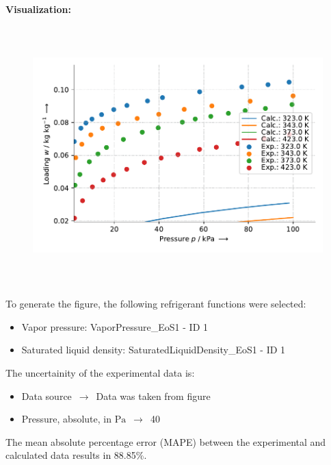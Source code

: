 \textbf{Visualization:}
%
\begin{figure}[!htp]
{\noindent\includegraphics[height=10cm, keepaspectratio]{figs/ads/ads_Propylene_zeolite_pellet_5A_Toth_1.pdf}}
\end{figure}
%

To generate the figure, the following refrigerant functions were selected:
\begin{itemize}
\item Vapor pressure: VaporPressure\_EoS1 - ID 1
\item Saturated liquid density: SaturatedLiquidDensity\_EoS1 - ID 1
\end{itemize}

The uncertainity of the experimental data is:
\begin{itemize}
\item Data source $\,\to\,$ Data was taken from figure
\item Pressure, absolute, in $\si{\pascal}$ $\,\to\,$ 40
\end{itemize}

The mean absolute percentage error (MAPE) between the experimental and calculated data results in 88.85\%.
\FloatBarrier
\newpage
